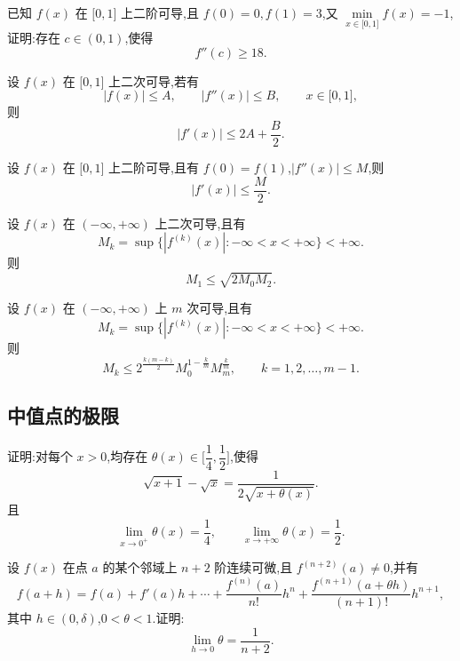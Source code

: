 \documentclass[../数学分析培优讲义.tex]{subfiles}
\begin{document}
\begin{example}
已知 $f(x)$ 在 $\lbrack 0,1\rbrack$ 上二阶可导,且 $f(0)=0,f(1)=3$,又
$\displaystyle\min\limits_{x\in\lbrack 0,1\rbrack}f(x)=-1$,证明:存在 $c\in(0,1)$,使得
\[
    f''(c)\geq18.
\]
\end{example}
\exampleblank

\begin{example}[\markstar]
设 $f(x)$ 在 $\lbrack 0,1\rbrack$ 上二次可导,若有
\[
    |f(x)|\leq A,\qquad |f''(x)|\leq B,\qquad x\in\lbrack 0,1\rbrack,
\]
则
\[
    |f'(x)|\leq2A+\dfrac{B}{2}.
\]
\end{example}
\exampleblank

\begin{example}
设 $f(x)$ 在 $\lbrack 0,1\rbrack$ 上二阶可导,且有 $f(0)=f(1)$,$|f''(x)|\leq M$,则
\[
    |f'(x)|\leq\dfrac{M}{2}.
\]
\end{example}
\exampleblank

\begin{example}[\markstar]
设 $f(x)$ 在 $(-\infty,+\infty)$ 上二次可导,且有
\[
    M_k=\sup\{|f^{(k)}(x)|:-\infty<x<+\infty\}<+\infty.
\]
则
\[
    M_1\leq\sqrt{2M_0M_2}.
\]
\end{example}
\exampleblank

\begin{example}[\markstar]
设 $f(x)$ 在 $(-\infty,+\infty)$ 上 $m$ 次可导,且有
\[
    M_k=\sup\{|f^{(k)}(x)|:-\infty<x<+\infty\}<+\infty.
\]
则
\[
    M_k\leq2^{\frac{k(m-k)}{2}}M_0^{1-\frac{k}{m}}M_m^{\frac{k}{m}},
    \qquad k=1,2,\ldots,m-1.
\]
\end{example}
\exampleblank


\newpage

\subsection{中值点的极限}

\begin{example}
证明:对每个 $x>0$,均存在 $\theta(x)\in\lbrack \dfrac{1}{4},\dfrac{1}{2}\rbrack$,使得
\[
    \sqrt{x+1}-\sqrt{x}=\dfrac{1}{2\sqrt{x+\theta(x)}}.
\]
且
\[
    \lim\limits_{x\to0^+}\theta(x)=\dfrac{1}{4},
    \qquad
    \lim\limits_{x\to+\infty}\theta(x)=\dfrac{1}{2}.
\]
\end{example}
\exampleblank

\begin{example}
设 $f(x)$ 在点 $a$ 的某个邻域上 $n+2$ 阶连续可微,且 $f^{(n+2)}(a)\neq0$,并有
\[
    f(a+h)=f(a)+f'(a)h+\cdots+\dfrac{f^{(n)}(a)}{n!}h^n
    +\dfrac{f^{(n+1)}(a+\theta h)}{(n+1)!}h^{n+1},
\]
其中 $h\in(0,\delta)$,$0<\theta<1$.证明:
\[
    \lim\limits_{h\to0}\theta=\dfrac{1}{n+2}.
\]
\end{example}
\exampleblank
\end{document}

